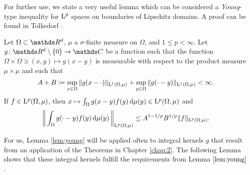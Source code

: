 
For further use, we state a very useful lemma which can be considered a \emph{Young}-type inequality for $\mathrm{L}^p$ spaces on boundaries of Lipschitz domains.
A proof can be found in Tolksdorf \cite[Prop 1.1.4]{tolksdorf}.

\begin{lem}
  \label{lem:young}
  Let $\Omega \subset \R^d$, $\mu$ a $\sigma$-finite measure on $\Omega$, and $1 \leq p < \infty$.
  Let $g \colon \R^d \setminus \{ 0\} \to \C$ be a function such that the function $\Omega \times \Omega \ni (x, y) \mapsto g(x-y)$ is measurable with respect to the product measure $\mu \times \mu$ and such that
  \begin{align*}
    A + B \coloneqq \sup_{x \in \Omega} \| g(x - \cdot) \|_{\mathrm{L}^1(\Omega, \mu)} + \sup_{y \in \Omega} \|g(\cdot - y) \|_{\mathrm{L}^1(\Omega, \mu)} < \infty.
  \end{align*}
  If $f \in \mathrm{L}^p(\Omega, \mu)$, then $x \mapsto \int_\Omega g(x - y) f(y) \, {\operatorname{d}\!{\mu}}(y) \in \mathrm{L}^p(\Omega, \mu)$ and
  \begin{align*}
    \bigg\| \int_\Omega g(\cdot - y) f(y) \, {\operatorname{d}\!{\mu}}(y)\, \bigg\|_{\mathrm{L}^p(\Omega, \mu)} \leq A^{1 - 1/p} B^{1/p} \|f\|_{\mathrm{L}^p(\Omega, \mu)}.
  \end{align*}
\end{lem}

For us, Lemma \ref{lem:young} will be applied often to integral kernels $g$ that result from an application of the Theorems in Chapter \ref{chap:2}.
The following Lemma shows that these integral kernels fulfill the requirements from Lemma $\ref{lem:young}$.

